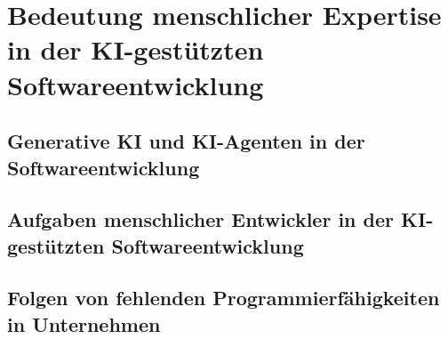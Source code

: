 \section{Bedeutung menschlicher Expertise in der KI-gestützten Softwareentwicklung}

\subsection{Generative KI und KI-Agenten in der Softwareentwicklung}

\subsection{Aufgaben menschlicher Entwickler in der KI-gestützten Softwareentwicklung}

\subsection{Folgen von fehlenden Programmierfähigkeiten in Unternehmen}
